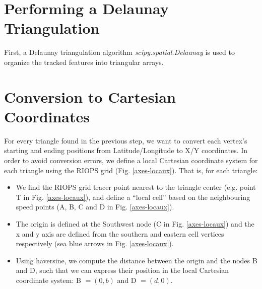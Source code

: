 \documentclass[draft]{agujournal2018}
\begin{document}
\section{Performing a Delaunay Triangulation}

First, a Delaunay triangulation algorithm \textit{scipy.spatial.Delaunay} is used to organize the tracked features into triangular arrays. 

\section{Conversion to Cartesian Coordinates}

For every triangle found in the previous step, we want to convert each vertex's starting and ending positions from Latitude/Longitude to X/Y coordinates. In order to avoid conversion errors, we define a local Cartesian coordinate system for each triangle using the RIOPS grid (Fig. \ref{axes-locaux}). That is, for each triangle:

\begin{itemize}
    \item We find the RIOPS grid tracer point nearest to the triangle center (e.g. point T in Fig. \ref{axes-locaux}), and define a ``local cell'' based on the neighbouring speed points (A, B, C and D in Fig. \ref{axes-locaux}).
    \item The origin is defined at the Southwest node (C in Fig. \ref{axes-locaux}) and the x and y axis are defined from the southern and eastern cell vertices respectively (sea blue arrows in Fig. \ref{axes-locaux}).
    
    \item Using haversine, we compute the distance between the origin and the nodes B and D, such that we can express their position in the local Cartesian coordinate system: B $ = (0, b)$ and D $=(d,0)$.
\end{itemize}
\end{document}

